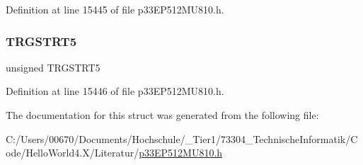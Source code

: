 Definition at line 15445 of file p33\+E\+P512\+M\+U810.\+h.

\mbox{\label{structtag_t_r_g_c_o_n6_b_i_t_s_aabeb06bb6258310e01e1a0cd96bf30ca}} 
\subsubsection{\texorpdfstring{T\+R\+G\+S\+T\+R\+T5}{TRGSTRT5}}
{\footnotesize\ttfamily unsigned T\+R\+G\+S\+T\+R\+T5}



Definition at line 15446 of file p33\+E\+P512\+M\+U810.\+h.



The documentation for this struct was generated from the following file\+:\begin{DoxyCompactItemize}
\item 
C\+:/\+Users/00670/\+Documents/\+Hochschule/\+\_\+\+Tier1/73304\+\_\+\+Technische\+Informatik/\+Code/\+Hello\+World4.\+X/\+Literatur/\hyperlink{p33_e_p512_m_u810_8h}{p33\+E\+P512\+M\+U810.\+h}\end{DoxyCompactItemize}
